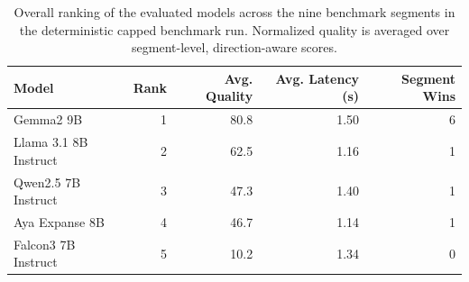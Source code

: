 \begin{table}[t]
\centering
\caption{Overall ranking of the evaluated models across the nine benchmark segments in the deterministic capped benchmark run. Normalized quality is averaged over segment-level, direction-aware scores.}
\label{tab:capped-overall-ranking}
\begin{tabular}{lrrrr}
\toprule
Model & Rank & Avg. Quality & Avg. Latency (s) & Segment Wins \\
\midrule
Gemma2 9B & 1 & 80.8 & 1.50 & 6 \\
Llama 3.1 8B Instruct & 2 & 62.5 & 1.16 & 1 \\
Qwen2.5 7B Instruct & 3 & 47.3 & 1.40 & 1 \\
Aya Expanse 8B & 4 & 46.7 & 1.14 & 1 \\
Falcon3 7B Instruct & 5 & 10.2 & 1.34 & 0 \\
\bottomrule
\end{tabular}
\end{table}
